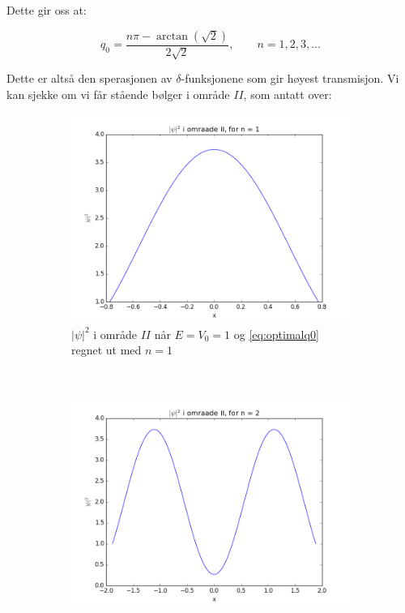 \documentclass[a4paper,norsk, 10pt]{article}
\numberwithin{equation}{section}
\begin{document}
Dette gir oss at:

\begin{equation}
q_0 = \frac{n\pi - \arctan(\sqrt{2})}{2\sqrt{2}}, \qquad n= 1,2,3,...
\label{eq:optimalq0}
\end{equation}


Dette er altså den sperasjonen av $\delta$-funksjonene som gir høyest transmisjon. Vi kan sjekke om vi får stående bølger i område $II$, som antatt over:

\begin{figure}[H]
\centering
\begin{subfigure}{0.3\textwidth}
\centering
\includegraphics[width = \textwidth]{psin1.png}
\caption{$|\psi|^2$ i område $II$ når $E = V_0 = 1$ og \eqref{eq:optimalq0} regnet ut med $n=1$}
\end{subfigure}
~
\begin{subfigure}{0.3\textwidth}
\centering
\includegraphics[width = \textwidth]{psin2.png}

\end{subfigure}
\end{figure}
\end{document}
